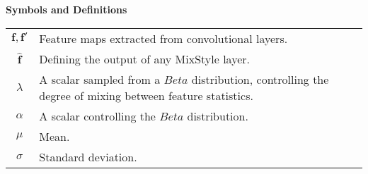 \centerline{\bf Symbols and Definitions}
\vspace{0.5em}

\bgroup
\def\arraystretch{1.5}  %
\begin{tabular}{c p{3.5in}}
	
	$\displaystyle \mathbf{f}, \mathbf{f}'$ & Feature maps extracted from convolutional layers. \\
	
	$\displaystyle \mathbf{\hat{f}}$ & Defining the output of any MixStyle layer. \\
	
	$\displaystyle \lambda$ & A scalar sampled from a $Beta$ distribution, controlling the degree of mixing between feature statistics. \\
	
	$\displaystyle \alpha$ & A scalar controlling the $Beta$ distribution. \\
	
	$\displaystyle \mu$ & Mean. \\
	
	$\displaystyle \sigma$ & Standard deviation. \\
	
\end{tabular}
\egroup

\clearpage